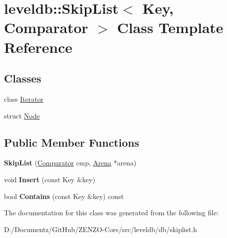 \hypertarget{classleveldb_1_1_skip_list}{}\section{leveldb\+::Skip\+List$<$ Key, Comparator $>$ Class Template Reference}
\label{classleveldb_1_1_skip_list}
\subsection*{Classes}
\begin{DoxyCompactItemize}
\item 
class \mbox{\hyperlink{classleveldb_1_1_skip_list_1_1_iterator}{Iterator}}
\item 
struct \mbox{\hyperlink{structleveldb_1_1_skip_list_1_1_node}{Node}}
\end{DoxyCompactItemize}
\subsection*{Public Member Functions}
\begin{DoxyCompactItemize}
\item 
\mbox{\label{classleveldb_1_1_skip_list_a793060fb1b44b01c6f510aa16387c6ee}} 
{\bfseries Skip\+List} (\mbox{\hyperlink{structleveldb_1_1_comparator}{Comparator}} cmp, \mbox{\hyperlink{classleveldb_1_1_arena}{Arena}} $\ast$arena)
\item 
\mbox{\label{classleveldb_1_1_skip_list_af1ed755f0825f38272aafe3cae4da644}} 
void {\bfseries Insert} (const Key \&key)
\item 
\mbox{\label{classleveldb_1_1_skip_list_a689b9724beb6c224c01cf1b9d8699e16}} 
bool {\bfseries Contains} (const Key \&key) const
\end{DoxyCompactItemize}


The documentation for this class was generated from the following file\+:\begin{DoxyCompactItemize}
\item 
D\+:/\+Documentz/\+Git\+Hub/\+Z\+E\+N\+Z\+O-\/\+Core/src/leveldb/db/skiplist.\+h\end{DoxyCompactItemize}
